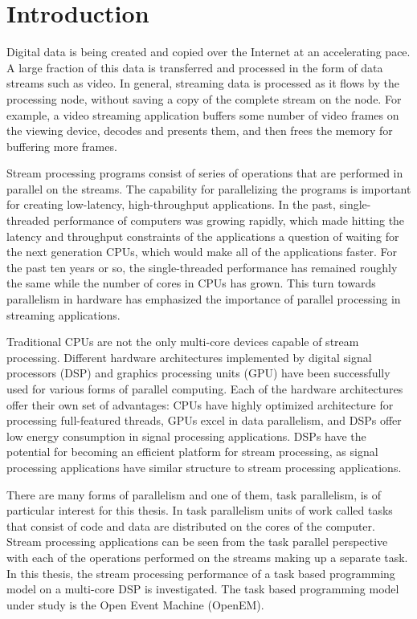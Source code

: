 \chapter{Introduction}
\label{chapter:introduction}
Digital data is being created and copied over the Internet at an accelerating pace. A large fraction of this data is transferred and processed in the form of data streams such as video. In general, streaming data is processed as it flows by the processing node, without saving a copy of the complete stream on the node. For example, a video streaming application buffers some number of video frames on the viewing device, decodes and presents them, and then frees the memory for buffering more frames.

Stream processing programs consist of series of operations that are performed in parallel on the streams. The capability for parallelizing the programs is important for creating low-latency, high-throughput applications. In the past, single-threaded performance of computers was growing rapidly, which made hitting the latency and throughput constraints of the applications a question of waiting for the next generation CPUs, which would make all of the applications faster. For the past ten years or so, the single-threaded performance has remained roughly the same while the number of cores in CPUs has grown. This turn towards parallelism in hardware has emphasized the importance of parallel processing in streaming applications.

Traditional CPUs are not the only multi-core devices capable of stream processing. Different hardware architectures implemented by digital signal processors (DSP) and graphics processing units (GPU) have been successfully used for various forms of parallel computing. Each of the hardware architectures offer their own set of advantages: CPUs have highly optimized architecture for processing full-featured threads, GPUs excel in data parallelism, and DSPs offer low energy consumption in signal processing applications. DSPs have the potential for becoming an efficient platform for stream processing, as signal processing applications have similar structure to stream processing applications.

There are many forms of parallelism and one of them, task parallelism, is of particular interest for this thesis. In task parallelism units of work called tasks that consist of code and data are distributed on the cores of the computer. Stream processing applications can be seen from the task parallel perspective with each of the operations performed on the streams making up a separate task. In this thesis, the stream processing performance of a task based programming model on a multi-core DSP is investigated. The task based programming model under study is the Open Event Machine (OpenEM).

